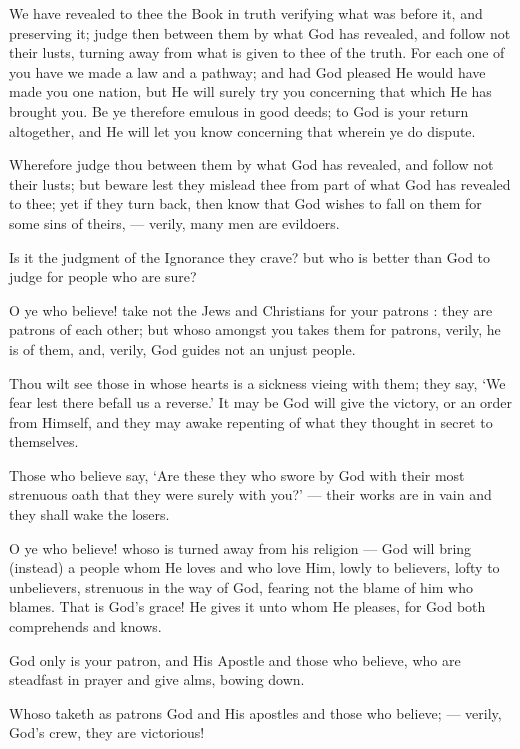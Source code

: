 \documentclass[fontsize=14pt, letterpaper, notitlepage, openany, DIV=12]{scrbook} %
\begin{document}
\noindent[5:48]
We have revealed to thee the Book in truth verifying what was before it, and preserving
it; judge then between them by what God has revealed, and follow not their lusts, turning away
from what is given to thee of the truth. For each one of you have we made a law and a pathway;
and had God pleased He would have made you one nation, but He will surely try you concerning
that which He has brought you. Be ye therefore emulous in good deeds; to God is your return
altogether, and He will let you know concerning that wherein ye do dispute.

\noindent[5:49]
Wherefore judge thou between them by what God has revealed, and follow not their
lusts; but beware lest they mislead thee from part of what God has revealed to thee; yet if they
turn back, then know that God wishes to fall on them for some sins of theirs, --- verily, many
men are evildoers.

\noindent[5:50]
Is it the judgment of the Ignorance they crave? but who is better than God to judge for
people who are sure?

\noindent[5:51]
O ye who believe! take not the Jews and Christians for your patrons : they are patrons of
each other; but whoso amongst you takes them for patrons, verily, he is of them, and, verily, God
guides not an unjust people.

\noindent[5:52]
Thou wilt see those in whose hearts is a sickness vieing with them; they say, `We fear lest
there befall us a reverse.' It may be God will give the victory, or an order from Himself, and they
may awake repenting of what they thought in secret to themselves.

\noindent[5:53]
Those who believe say, `Are these they who swore by God with their most strenuous oath
that they were surely with you?' --- their works are in vain and they shall wake the losers.

\noindent[5:54]
O ye who believe! whoso is turned away from his religion --- God will bring (instead) a
people whom He loves and who love Him, lowly to believers, lofty to unbelievers, strenuous in
the way of God, fearing not the blame of him who blames. That is God's grace! He gives it unto
whom He pleases, for God both comprehends and knows.

\noindent[5:55]
God only is your patron, and His Apostle and those who believe, who are steadfast in
prayer and give alms, bowing down.

\noindent[5:56]
Whoso taketh as patrons God and His apostles and those who believe; --- verily, God's
crew, they are victorious!
\end{document}
